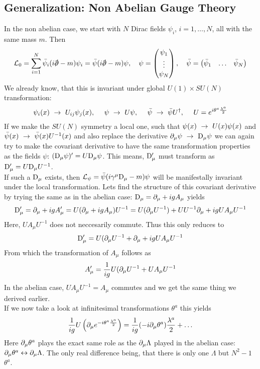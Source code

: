 \subsection{Generalization: Non Abelian Gauge Theory}
In the non abelian case, we start with $N$ Dirac fields $\psi_i$, $i = 1, \ldots, N$, all with the same mass $m$. Then
\[ \LL_0 = \sum_{i = 1}^N \bar{\psi}_i ( i \slashed{\p} - m ) \psi_i = \bar{\psi}( i \slashed{\p}- m) \psi, ~~~ \psi = \vektor{\psi_1}{\vdots}{\psi_N}, ~~~ \bar{\psi} = \begin{pmatrix}\bar{\psi}_1 & \ldots & \bar{\psi}_N\end{pmatrix}\]
We already know, that this is invariant under global $U(1)\times SU(N)$ transformation:
\[ \psi_i(x) ~\rightarrow~ U_{ij} \psi_j(x), ~~~~ \psi ~\rightarrow~ U \psi, ~~~~ \bar{\psi}~\rightarrow~\bar{\psi}U^\dagger, ~~~~ U = e^{i \theta^a \frac{\lambda^a}{2}}
\]
If we make the $SU(N)$ symmetry a local one, such that $\psi(x) ~\rightarrow~ U(x) \psi(x)$ and $\bar{\psi}(x) ~\rightarrow~\bar{\psi}(x) U^{-1}(x)$ and also replace the derivative $\partial_\mu \psi ~\rightarrow~ {\rm D}_\mu \psi$ we can again try to make the covariant derivative to have the same transformation properties as the fields $\psi$: $({\rm D}_\mu \psi)' = U {\rm D}_\mu \psi$. This means, ${\rm D}'_\mu$ must transform as ${\rm D}'_\mu = U {\rm D}_\mu U^{-1}$.\\
If such a ${\rm D}_\mu$ exists, then $\mathcal{L}_\psi = \bar{\psi}(i \gamma^\mu {\rm D}_\mu - m ) \psi$ will be manifestally invariant under the local transformation. Lets find the structure of this covariant derivative by trying the same as in the abelian case:
${\rm D}_\mu = \partial_\mu + i g A_\mu$ yields
\[{\rm D}'_\mu = \partial_\mu + i g A'_\mu = U(\partial_\mu + i gA_\mu) U^{-1} = U( \partial_\mu U^{-1}) + UU^{-1} \partial_\mu + i g U A_\mu U^{-1}\]
Here, $U A_\mu U^{-1}$ does not neccesarily commute. Thus this only reduces to
\[ {\rm D}'_\mu = U(\partial_\mu U^{-1} + \partial_\mu + i g U A_\mu U^{-1}\]
From which the transformation of $A_\mu$ follows as
\[ A'_\mu = \frac{1}{ig} U( \partial_\mu U^{-1} + U A_\mu U^{-1}\]
In the abelian case, $U A_\mu U^{-1} = A_\mu$ commutes and we get the same thing we derived earlier.\\
If we now take a look at infinitesimal transformations $\theta^a$ this yields
\[ \frac{1}{ig} U \left( \partial_\mu e^{-i \theta^a \frac{\lambda^a}{2}}\right) = \frac{1}{ig} ( -i \partial_\mu \theta^a) \frac{\lambda^a}{2} + \ldots\]
Here $\partial_\mu \theta^a$ plays the exact same role as the $\partial_\mu \Lambda$ played in the abelian case: $\partial_\mu \theta^a \leftrightarrow \partial_\mu \Lambda$. The only real difference being, that there is only one $\Lambda$ but $N^2 -1$ $\theta^a$.\\
